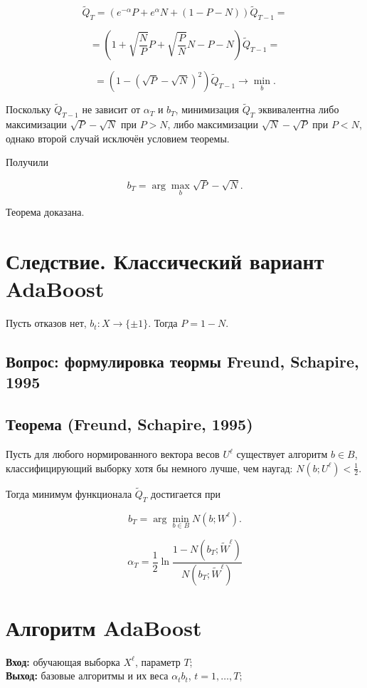 \[
\widetilde{Q}_T = (e^{-\alpha} P + e^{\alpha} N + (1 - P - N)) \widetilde{Q}_{T-1} = 
\]

\[
= \left(1 + \sqrt{\frac{N}{P}} P + \sqrt{\frac{P}{N}} N - P - N\right) \widetilde{Q}_{T-1} = 
\]

\[
= \left(1 - (\sqrt{P} - \sqrt{N})^2\right) \widetilde{Q}_{T-1} \rightarrow \min_b.
\]

Поскольку \(\widetilde{Q}_{T-1}\) не зависит от \(\alpha_T\) и \(b_T\), минимизация \(\widetilde{Q}_T\) эквивалентна либо максимизации \(\sqrt{P} - \sqrt{N}\) при \(P > N\), либо максимизации \(\sqrt{N} - \sqrt{P}\) при \(P < N\), однако второй случай исключён условием теоремы.

Получили

\[
b_T = \arg \max_b \sqrt{P} - \sqrt{N}.
\]

Теорема доказана.


\section*{Следствие. Классический вариант AdaBoost}

Пусть отказов нет, $b_t : X \to \{ \pm 1 \}$. Тогда $P = 1 - N$.
\subsection*{Вопрос: формулировка теормы Freund, Schapire, 1995}
\subsection*{Теорема (Freund, Schapire, 1995)}

Пусть для любого нормированного вектора весов $U^\ell$ существует алгоритм $b \in B$, классифицирующий выборку хотя бы немного лучше, чем наугад: $N(b; U^\ell) < \frac{1}{2}$.

Тогда минимум функционала $\tilde{Q}_T$ достигается при

\[
b_T = \arg \min_{b \in B} N(b; W^\ell).
\]

\[
\alpha_T = \frac{1}{2} \ln \frac{1 - N(b_T; \tilde{W}^\ell)}{N(b_T; \tilde{W}^\ell)}
\]


\section*{Алгоритм AdaBoost}

\textbf{Вход:} обучающая выборка $X^\ell$, параметр $T$;\\
\textbf{Выход:} базовые алгоритмы и их веса $\alpha_t b_t$, $t = 1, \ldots, T$;

